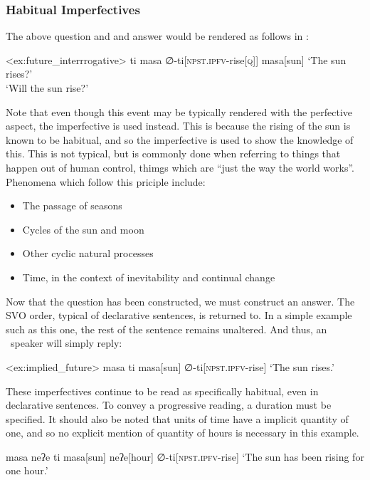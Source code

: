 \subsubsection{Habitual Imperfectives}

The above question and and answer would be rendered as follows in \langname :

\ex<ex:future_interrrogative>
\begingl
\glpreamble ti masa
\endpreamble
∅-ti[\textsc{npst.ipfv-}rise\textsc{[q]}]
masa[sun]
\glft `The sun rises?'\\`Will the sun rise?'
\endgl
\xe

Note that even though this event may be typically rendered with the perfective aspect, the imperfective is used instead.
This is because the rising of the sun is known to be habitual, and so the imperfective is used to show the knowledge of this.
This is not typical, but is commonly done when referring to things that happen out of human control, thimgs which are ``just the way the world works''.
Phenomena which follow this priciple include:

\begin{itemize}
  \item The passage of seasons
  \item Cycles of the sun and moon
  \item Other cyclic natural processes
  \item Time, in the context of inevitability and continual change
\end{itemize}

Now that the question has been constructed, we must construct an answer.
The SVO order, typical of declarative sentences, is returned to.
In a simple example such as this one, the rest of the sentence remains unaltered.
And thus, an \langname\ speaker will simply reply:

\ex<ex:implied_future>
\begingl
\glpreamble masa ti
\endpreamble
masa[sun] ∅-ti[\textsc{npst.ipfv-}rise]
\glft `The sun rises.'
\endgl
\xe

These imperfectives continue to be read as specifically habitual, even in declarative sentences.
To convey a progressive reading, a duration must be specified.
It should also be noted that units of time have a implicit quantity of one, and so no explicit mention of quantity of hours is necessary in this example.

\ex
\begingl
\glpreamble masa neʔe ti
\endpreamble
masa[sun]
neʔe[hour]
∅-ti[\textsc{npst.ipfv-}rise]
\glft `The sun has been rising for one hour.'
\endgl
\xe

